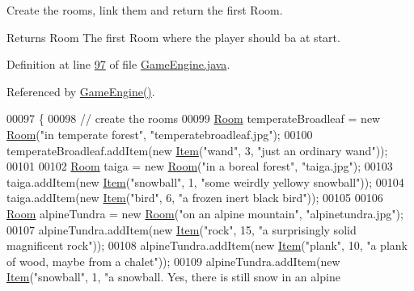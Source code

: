 Create the rooms, link them and return the first Room. 

\begin{DoxyReturn}{Returns}
Room The first Room where the player should ba at start. 
\end{DoxyReturn}


Definition at line \hyperlink{GameEngine_8java_source_l00097}{97} of file \hyperlink{GameEngine_8java_source}{Game\-Engine.\-java}.



Referenced by \hyperlink{GameEngine_8java_source_l00059}{Game\-Engine()}.


\begin{DoxyCode}
00097                                \{
00098         \textcolor{comment}{// create the rooms}
00099         \hyperlink{classpkg__world_1_1Room}{Room} temperateBroadleaf = \textcolor{keyword}{new} \hyperlink{classpkg__world_1_1Room}{Room}(\textcolor{stringliteral}{"in temperate forest"}, \textcolor{stringliteral}{"temperatebroadleaf.jpg"});
00100         temperateBroadleaf.addItem(\textcolor{keyword}{new} \hyperlink{classpkg__world_1_1Item}{Item}(\textcolor{stringliteral}{"wand"}, 3, \textcolor{stringliteral}{"just an ordinary wand"}));
00101 
00102         \hyperlink{classpkg__world_1_1Room}{Room} taiga = \textcolor{keyword}{new} \hyperlink{classpkg__world_1_1Room}{Room}(\textcolor{stringliteral}{"in a boreal forest"}, \textcolor{stringliteral}{"taiga.jpg"});
00103         taiga.addItem(\textcolor{keyword}{new} \hyperlink{classpkg__world_1_1Item}{Item}(\textcolor{stringliteral}{"snowball"}, 1, \textcolor{stringliteral}{"some weirdly yellowy snowball"}));
00104         taiga.addItem(\textcolor{keyword}{new} \hyperlink{classpkg__world_1_1Item}{Item}(\textcolor{stringliteral}{"bird"}, 6, \textcolor{stringliteral}{"a frozen inert black bird"}));
00105 
00106         \hyperlink{classpkg__world_1_1Room}{Room} alpineTundra = \textcolor{keyword}{new} \hyperlink{classpkg__world_1_1Room}{Room}(\textcolor{stringliteral}{"on an alpine mountain"}, \textcolor{stringliteral}{"alpinetundra.jpg"});
00107         alpineTundra.addItem(\textcolor{keyword}{new} \hyperlink{classpkg__world_1_1Item}{Item}(\textcolor{stringliteral}{"rock"}, 15, \textcolor{stringliteral}{"a surprisingly solid magnificent rock"}));
00108         alpineTundra.addItem(\textcolor{keyword}{new} \hyperlink{classpkg__world_1_1Item}{Item}(\textcolor{stringliteral}{"plank"}, 10, \textcolor{stringliteral}{"a plank of wood, maybe from a chalet"}));
00109         alpineTundra.addItem(\textcolor{keyword}{new} \hyperlink{classpkg__world_1_1Item}{Item}(\textcolor{stringliteral}{"snowball"}, 1, \textcolor{stringliteral}{"a snowball. Yes, there is still snow in an alpine
}
\end{DoxyCode}
